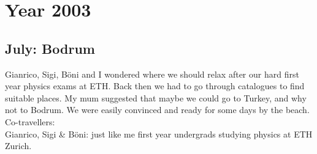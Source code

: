 \chapter{Year 2003}
\label{2003}

\section{July: Bodrum}
\label{2003:Bodrum}

Gianrico, Sigi, B\"oni and I wondered where we should relax after our hard first year physics exams at ETH. Back then we had to go through catalogues to find suitable places. My mum suggested that maybe we could go to Turkey, and why not to Bodrum. We were easily convinced and ready for some days by the beach.\\

Co-travellers:\\
Gianrico, Sigi \& B\"oni: just like me first year undergrads studying physics at ETH Zurich.\\

